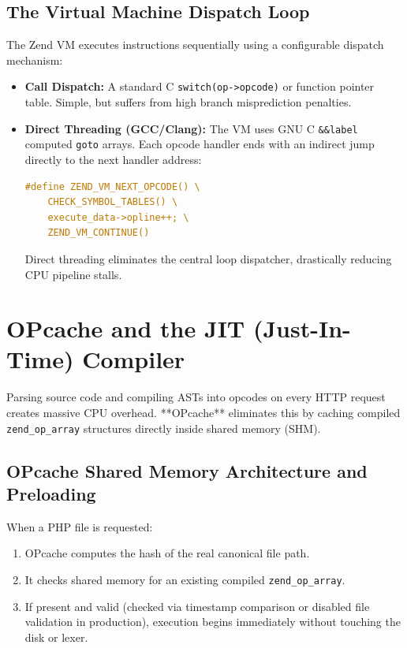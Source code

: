 \subsection{The Virtual Machine Dispatch Loop}

The Zend VM executes instructions sequentially using a configurable dispatch mechanism:
\begin{itemize}[leftmargin=15pt]
  \item \textbf{Call Dispatch:} A standard C \texttt{switch(op->opcode)} or function pointer table. Simple, but suffers from high branch misprediction penalties.
  \item \textbf{Direct Threading (GCC/Clang):} The VM uses GNU C \texttt{\&\&label} computed \texttt{goto} arrays. Each opcode handler ends with an indirect jump directly to the next handler address:
  \begin{lstlisting}[language=C]
#define ZEND_VM_NEXT_OPCODE() \
    CHECK_SYMBOL_TABLES() \
    execute_data->opline++; \
    ZEND_VM_CONTINUE()
  \end{lstlisting}
  Direct threading eliminates the central loop dispatcher, drastically reducing CPU pipeline stalls.
\end{itemize}

\section{OPcache and the JIT (Just-In-Time) Compiler}

Parsing source code and compiling ASTs into opcodes on every HTTP request creates massive CPU overhead. **OPcache** eliminates this by caching compiled \texttt{zend\_op\_array} structures directly inside shared memory (SHM).

\subsection{OPcache Shared Memory Architecture and Preloading}

When a PHP file is requested:
\begin{enumerate}[leftmargin=15pt]
  \item OPcache computes the hash of the real canonical file path.
  \item It checks shared memory for an existing compiled \texttt{zend\_op\_array}.
  \item If present and valid (checked via timestamp comparison or disabled file validation in production), execution begins immediately without touching the disk or lexer.
\end{enumerate}

